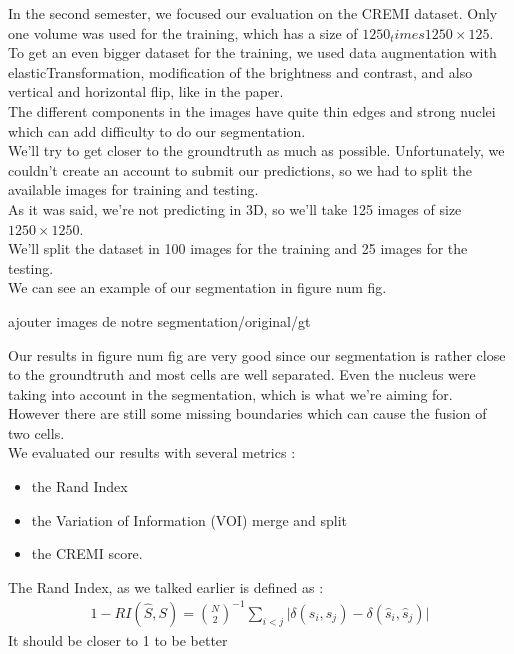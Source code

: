 In the second semester, we focused our evaluation on the CREMI dataset. Only one volume was used for the training, which has a size of $1250_times 1250\times 125$.\\
To get an even bigger dataset for the training, we used data augmentation with elasticTransformation, modification of the brightness and contrast, and also vertical and horizontal flip, like in the paper.\\
The different components in the images have quite thin edges and strong nuclei which can add difficulty to do our segmentation.\\
We’ll try to get closer to the groundtruth as much as possible. Unfortunately, we couldn’t create an account to submit our predictions, so we had to split the available images for training and testing.\\ 
As it was said, we’re not predicting in 3D, so we’ll take 125 images of size $1250\times 1250$.\\ 
We’ll split the dataset in 100 images for the training and 25 images for the testing.\\
We can see an example of our segmentation in figure {\color{red} num fig}.

{\color{red} ajouter images de notre segmentation/original/gt}

Our results in figure {\color{red} num fig} are very good since our segmentation is rather close to the groundtruth and most cells are well separated.
Even the nucleus were taking into account in the segmentation, which is what we're aiming for.\\
However there are still some missing boundaries which can cause the fusion of two cells.\\

We evaluated our results with several metrics :
\begin{itemize}
  \item the Rand Index
  \item the Variation of Information (VOI) merge and split
  \item the CREMI score.
\end{itemize}

The Rand Index, as we talked earlier is defined as :\\
\begin{gather*}
	1 - RI(\hat{S},S) = \binom{N}{2}^{-1} \sum_{i<j} \lvert \delta(s_i,s_j) -
	\delta(\hat{s}_i,\hat{s}_j) \rvert
\end{gather*}
It should be closer to 1 to be better\\

